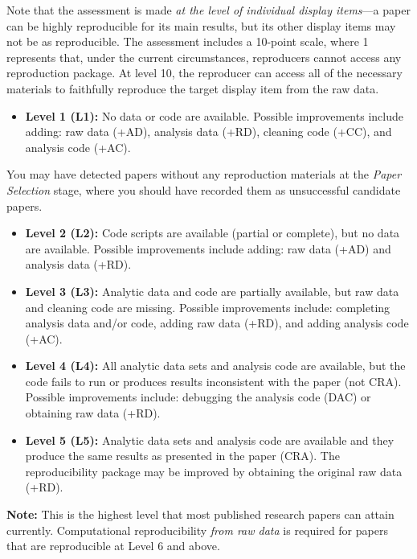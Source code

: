 \documentclass[
]{book}
\providecommand{\tightlist}{%
  \setlength{\itemsep}{0pt}\setlength{\parskip}{0pt}}
\begin{document}
Note that the assessment is made \emph{at the level of individual display items}---a paper can be highly reproducible for its main results, but its other display items may not be as reproducible. The assessment includes a 10-point scale, where 1 represents that, under the current circumstances, reproducers cannot access any reproduction package. At level 10, the reproducer can access all of the necessary materials to faithfully reproduce the target display item from the raw data.

\begin{itemize}
\tightlist
\item
  \textbf{Level 1 (L1):} No data or code are available. Possible improvements include adding: raw data (+AD), analysis data (+RD), cleaning code (+CC), and analysis code (+AC).
\end{itemize}

You may have detected papers without any reproduction materials at the \emph{Paper Selection} stage, where you should have recorded them as unsuccessful candidate papers.

\begin{itemize}
\item
  \textbf{Level 2 (L2):} Code scripts are available (partial or complete), but no data are available. Possible improvements include adding: raw data (+AD) and analysis data (+RD).
\item
  \textbf{Level 3 (L3):} Analytic data and code are partially available, but raw data and cleaning code are missing. Possible improvements include: completing analysis data and/or code, adding raw data (+RD), and adding analysis code (+AC).
\item
  \textbf{Level 4 (L4):} All analytic data sets and analysis code are available, but the code fails to run or produces results inconsistent with the paper (not CRA). Possible improvements include: debugging the analysis code (DAC) or obtaining raw data (+RD).
\item
  \textbf{Level 5 (L5):} Analytic data sets and analysis code are available and they produce the same results as presented in the paper (CRA). The reproducibility package may be improved by obtaining the original raw data (+RD).
\end{itemize}

\textbf{Note:} This is the highest level that most published research papers can attain currently. Computational reproducibility \emph{from raw data} is required for papers that are reproducible at Level 6 and above.
\end{document}
